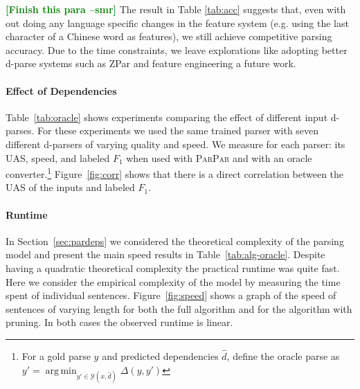 \documentclass[11pt,letterpaper]{article}
\DeclareMathOperator*{\argmin}{arg\,min}
\newcommand{\ParseName}{\textsc{ParPar}\xspace}
\newcommand{\smrcomment}[1]{\textcolor{green}{\bf \small [#1 --smr]}}
\newcommand{\nascomment}[1]{\textcolor{blue}{\bf \small [#1 --nas]}}
\begin{document}
\smrcomment{Finish this para}
The result in Table \ref{tab:acc} suggests that, even with out doing
any language specific changes in the feature system (e.g. using the
last character of a Chinese word as features), we still achieve
competitive parsing accuracy. Due to the time constraints, we leave
explorations like adopting better d-parse systems such as ZPar
\cite{zhang2011syntactic} and feature engineering a future work.


\paragraph{Effect of Dependencies}

Table~\ref{tab:oracle} shows experiments comparing the effect of
different input d-parses.  For these experiments we used the same
trained parser with seven different d-parsers of varying quality and
speed. We measure for each parser: its UAS, speed, and labeled $F_1$
when used with \ParseName and with an oracle converter.\footnote{For a
  gold parse $y$ and predicted dependencies $\hat{d}$, define the
  oracle parse as $y' = \argmin_{y' \in \mathcal{Y}(x, \hat{d})}
  \Delta(y, y') $} Figure~\ref{fig:corr} shows that there is a direct
correlation between the UAS of the inputs and labeled $F_1$.




\paragraph{Runtime}

In Section~\ref{sec:pardeps} we considered the theoretical 
complexity of the parsing model and present the main 
speed results in Table~\ref{tab:alg-oracle}.
Despite having a quadratic theoretical complexity
the practical runtime was quite fast.
Here we consider the empirical complexity of the 
model by measuring the time spent of individual sentences. 
Figure~\ref{fig:speed} shows a graph of the speed of
sentences of varying length for both the full algorithm
and for the algorithm with pruning. In both 
cases the observed runtime is  linear.
\end{document}
